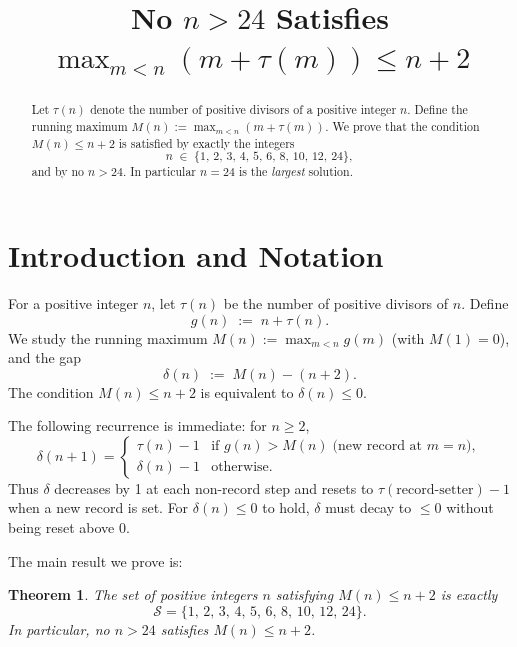 \documentclass[12pt]{article}
\theoremstyle{plain}
\newtheorem{theorem}{Theorem}
\theoremstyle{definition}
\begin{document}
\title{\textbf{No $n > 24$ Satisfies \(\max_{m<n}(m+\tau(m))\leq n+2\)}}
\author{}
\date{}
\maketitle

\begin{abstract}
Let $\tau(n)$ denote the number of positive divisors of a positive integer $n$.
Define the running maximum $M(n) := \max_{m < n}(m + \tau(m))$.
We prove that the condition $M(n) \leq n + 2$ is satisfied by exactly the integers
\[
  n \;\in\; \{1,\, 2,\, 3,\, 4,\, 5,\, 6,\, 8,\, 10,\, 12,\, 24\},
\]
and by no $n > 24$.  In particular $n = 24$ is the \emph{largest} solution.
\end{abstract}

\tableofcontents

\bigskip

\section{Introduction and Notation}

For a positive integer $n$, let $\tau(n)$ be the number of positive divisors of $n$.
Define
\[
  g(n) \;:=\; n + \tau(n).
\]
We study the running maximum $M(n) := \max_{m < n} g(m)$ (with $M(1) = 0$), and the gap
\[
  \delta(n) \;:=\; M(n) - (n + 2).
\]
The condition $M(n) \leq n + 2$ is equivalent to $\delta(n) \leq 0$.

\medskip
The following recurrence is immediate: for $n \geq 2$,
\begin{equation}\label{eq:recurrence}
  \delta(n+1) = \begin{cases}
    \tau(n) - 1 & \text{if } g(n) > M(n) \;\text{(new record at $m = n$)}, \\
    \delta(n) - 1 & \text{otherwise.}
  \end{cases}
\end{equation}
Thus $\delta$ decreases by 1 at each non-record step and resets to $\tau(\text{record-setter}) - 1$
when a new record is set.  For $\delta(n) \leq 0$ to hold, $\delta$ must decay to $\leq 0$
without being reset above 0.

\medskip
The main result we prove is:

\begin{theorem}\label{thm:main}
  The set of positive integers $n$ satisfying $M(n) \leq n + 2$ is exactly
  \[
    \mathcal{S} = \{1,\, 2,\, 3,\, 4,\, 5,\, 6,\, 8,\, 10,\, 12,\, 24\}.
  \]
  In particular, no $n > 24$ satisfies $M(n) \leq n + 2$.
\end{theorem}
\end{document}
